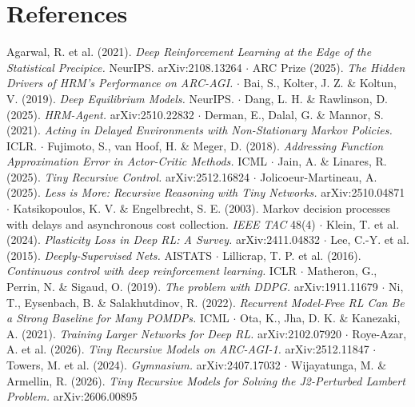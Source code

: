 \documentclass[11pt]{article}
\begin{document}
\section*{References}



Agarwal, R. et al. (2021). \emph{Deep Reinforcement Learning at the Edge of the Statistical Precipice.} NeurIPS. arXiv:2108.13264 $\cdot$ ARC Prize (2025). \emph{The Hidden Drivers of HRM's Performance on ARC-AGI.} $\cdot$ Bai, S., Kolter, J. Z. \& Koltun, V. (2019). \emph{Deep Equilibrium Models.} NeurIPS. $\cdot$ Dang, L. H. \& Rawlinson, D. (2025). \emph{HRM-Agent.} arXiv:2510.22832 $\cdot$ Derman, E., Dalal, G. \& Mannor, S. (2021). \emph{Acting in Delayed Environments with Non-Stationary Markov Policies.} ICLR. $\cdot$ Fujimoto, S., van Hoof, H. \& Meger, D. (2018). \emph{Addressing Function Approximation Error in Actor-Critic Methods.} ICML $\cdot$ Jain, A. \& Linares, R. (2025). \emph{Tiny Recursive Control.} arXiv:2512.16824 $\cdot$ Jolicoeur-Martineau, A. (2025). \emph{Less is More: Recursive Reasoning with Tiny Networks.} arXiv:2510.04871 $\cdot$ Katsikopoulos, K. V. \& Engelbrecht, S. E. (2003). Markov decision processes with delays and asynchronous cost collection. \emph{IEEE TAC} 48(4) $\cdot$ Klein, T. et al. (2024). \emph{Plasticity Loss in Deep RL: A Survey.} arXiv:2411.04832 $\cdot$ Lee, C.-Y. et al. (2015). \emph{Deeply-Supervised Nets.} AISTATS $\cdot$ Lillicrap, T. P. et al. (2016). \emph{Continuous control with deep reinforcement learning.} ICLR $\cdot$ Matheron, G., Perrin, N. \& Sigaud, O. (2019). \emph{The problem with DDPG.} arXiv:1911.11679 $\cdot$ Ni, T., Eysenbach, B. \& Salakhutdinov, R. (2022). \emph{Recurrent Model-Free RL Can Be a Strong Baseline for Many POMDPs.} ICML $\cdot$ Ota, K., Jha, D. K. \& Kanezaki, A. (2021). \emph{Training Larger Networks for Deep RL.} arXiv:2102.07920 $\cdot$ Roye-Azar, A. et al. (2026). \emph{Tiny Recursive Models on ARC-AGI-1.} arXiv:2512.11847 $\cdot$ Towers, M. et al. (2024). \emph{Gymnasium.} arXiv:2407.17032 $\cdot$ Wijayatunga, M. \& Armellin, R. (2026). \emph{Tiny Recursive Models for Solving the J2-Perturbed Lambert Problem.} arXiv:2606.00895
\end{document}
